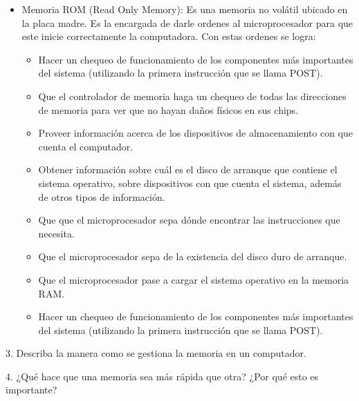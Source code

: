 \documentclass{article}
\begin{document}
\begin{itemize}
    \item Memoria ROM (Read Only Memory):
    Es una memoria no volátil ubicado en la placa madre.
    Es la encargada de darle ordenes al microprocesador para que este inicie correctamente la computadora.
    Con estas ordenes se logra: 
        \begin{itemize}
        \item
            Hacer un chequeo de funcionamiento de los componentes más importantes del sistema (utilizando la primera instrucción que se llama POST).
        \item 
            Que el controlador de memoria haga un chequeo de todas las direcciones de memoria para ver que no hayan daños físicos en sus chips. 
        \item 
            Proveer información acerca de los dispositivos de almacenamiento con que cuenta el computador.
        \item 
            Obtener información sobre cuál es el disco de arranque que contiene el sistema operativo, sobre dispositivos con que cuenta el sistema, además de otros tipos de información.
        \item
            Que que el microprocesador sepa dónde encontrar las instrucciones que necesita.
        \item
            Que el microprocesador sepa de la existencia del disco duro de arranque.
        \item
            Que el microprocesador pase a cargar el sistema operativo en la memoria RAM.
        \item
            Hacer un chequeo de funcionamiento de los componentes más importantes del sistema (utilizando la primera instrucción que se llama POST).
    \end{itemize}


\end{itemize}




\vspace{0.5cm}

\vspace{0.5cm}
3. Describa la manera como se gestiona la memoria en un computador.

\vspace{0.5cm}
4. ¿Qué hace que una memoria sea más rápida que otra? ¿Por qué esto es importante?

\vspace{0.5cm}


\end{document}
